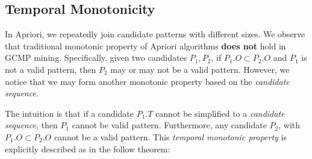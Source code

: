 %

%

%


\subsection{Temporal Monotonicity}
In Apriori, we repeatedly join candidate patterns with different sizes.
We observe that traditional monotonic property of Apriori algorithms \textbf{does not}
hold in GCMP mining. Specifically, given two candidates $P_1, P_2$, 
if $P_1.O \subset P_2.O$ and $P_1$ is not a valid pattern, 
then $P_2$ may or may not be a valid pattern. However, we notice that
we may form another monotonic property based on the \emph{candidate sequence}.

The intuition is that if a candidate $P_1.T$ cannot be simplified to 
a \emph{candidate sequence}, then $P_1$ cannot be valid pattern. 
Furthermore, any candidate $P_2$, with $P_1.O \subset P_2.O$ cannot be a valid pattern.
This \emph{temporal monotonic property} is explicitly described as in the follow theorem:

